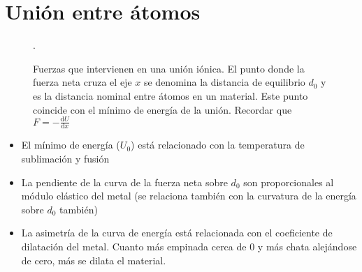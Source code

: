 \section{Unión entre átomos}

\begin{figure}
    \centering

\caption{Fuerzas que intervienen en una unión iónica. El punto donde la fuerza neta cruza el eje $x$ se denomina la distancia de equilibrio $d_0$ y es la distancia nominal entre átomos en un material. Este punto coincide con el mínimo de energía de la unión. Recordar que $F = - \frac{\textrm{d} U}{\textrm{d} x}$}.

\label{fig:curvas_condonmorse}

\end{figure}

\begin{itemize}
    \item El mínimo de energía ($U_0$) está relacionado con la temperatura de sublimación y fusión
    \item La pendiente de la curva de la fuerza neta sobre $d_0$ son proporcionales al módulo elástico del metal (se relaciona también con la curvatura de la energía sobre $d_0$ también)
    \item La asimetría de la curva de energía está relacionada con el coeficiente de dilatación del metal. Cuanto más empinada cerca de 0 y más chata alejándose de cero, más se dilata el material.
\end{itemize}



